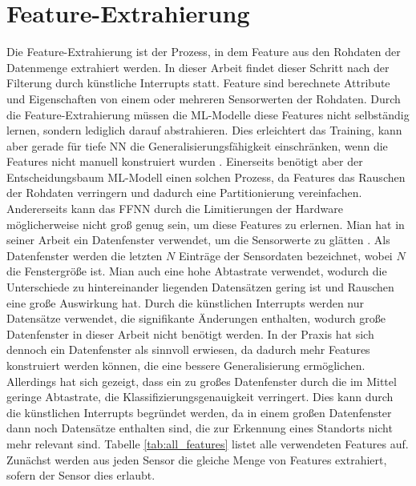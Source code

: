 \section{Feature-Extrahierung}
Die Feature-Extrahierung ist der Prozess, in dem Feature aus den Rohdaten der Datenmenge extrahiert werden.
In dieser Arbeit findet dieser Schritt nach der Filterung durch künstliche Interrupts statt.
Feature sind berechnete Attribute und Eigenschaften von einem oder mehreren Sensorwerten der Rohdaten.
\newline
\newline
Durch die Feature-Extrahierung müssen die ML-Modelle diese Features nicht selbständig lernen, sondern lediglich darauf abstrahieren.
Dies erleichtert das Training, kann aber gerade für tiefe NN die Generalisierungsfähigkeit einschränken,
wenn die Features nicht manuell konstruiert wurden \cite{seide2011feature}.
Einerseits benötigt aber der Entscheidungsbaum ML-Modell einen solchen Prozess,
da Features das Rauschen der Rohdaten verringern und dadurch eine Partitionierung vereinfachen.
Andererseits kann das FFNN durch die Limitierungen der Hardware möglicherweise nicht groß genug sein, um diese Features zu erlernen.
\newline
\newline
Mian hat in seiner Arbeit ein Datenfenster verwendet, um die Sensorwerte zu glätten \cite{naveedThesis}.
Als Datenfenster werden die letzten $N$ Einträge der Sensordaten bezeichnet, wobei $N$ die Fenstergröße ist.
Mian auch eine hohe Abtastrate verwendet, wodurch die Unterschiede zu hintereinander liegenden Datensätzen gering ist und Rauschen eine große Auswirkung hat.
Durch die künstlichen Interrupts werden nur Datensätze verwendet, die signifikante Änderungen enthalten,
wodurch große Datenfenster in dieser Arbeit nicht benötigt werden.
In der Praxis hat sich dennoch ein Datenfenster als sinnvoll erwiesen, da dadurch mehr Features konstruiert werden können,
die eine bessere Generalisierung ermöglichen.
Allerdings hat sich gezeigt, dass ein zu großes Datenfenster durch die im Mittel geringe Abtastrate, die Klassifizierungsgenauigkeit verringert.
Dies kann durch die künstlichen Interrupts begründet werden, da in einem großen Datenfenster dann
noch Datensätze enthalten sind, die zur Erkennung eines Standorts nicht mehr relevant sind.
\newline
\newline
Tabelle \ref{tab:all_features} listet alle verwendeten Features auf.
Zunächst werden aus jeden Sensor die gleiche Menge von Features extrahiert, sofern der Sensor dies erlaubt.
